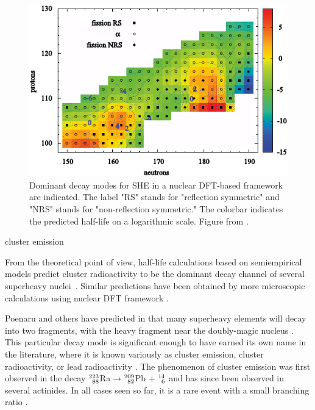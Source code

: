 \begin{figure}
	\centering
	\includegraphics[width=0.7\linewidth]{TeX_files/294Og_Warda2012_SHE}
	\caption[Dominant decay modes for SHE in a nuclear DFT-based framework.]{Dominant decay modes for SHE in a nuclear DFT-based framework are indicated. The label "RS" stands for "reflection symmetric" and "NRS" stands for "non-reflection symmetric." The colorbar indicates the predicted half-life on a logarithmic scale. Figure from \cite{Warda2012}.}
	\label{fig:warda2012she}
\end{figure}

cluster emission \cite{Sandulescu1980,Poenaru1986,Royer1998}

From the theoretical point of view, half-life calculations based on semiempirical models predict cluster radioactivity to be the dominant decay channel of several superheavy nuclei~\cite{Poenaru2011, Poenaru2012, Poenaru2013, Poenaru2015, Poenaru2018,Santhosh2018, Zhang2018}. Similar predictions have been obtained by more microscopic calculations using nuclear DFT framework \cite{Warda2011,Warda2018}.

Poenaru and others have predicted in \cite{Poenaru2011, Poenaru2012, Poenaru2013, Poenaru2015, Poenaru2018,Santhosh2018, Zhang2018} that many superheavy elements will decay into two fragments, with the heavy fragment near the doubly-magic nucleus {\Pb}. This particular decay mode is significant enough to have earned its own name in the literature, where it is known variously as cluster emission, cluster radioactivity, or lead radioactivity \cite{Sandulescu1980,Poenaru1986,Royer1998,Poenaru2010}. The phenomenon of cluster emission was first observed in the decay  $^{223}_{\hphantom{2}88}$Ra$\rightarrow$$^{209}_{\hphantom{2}82}$Pb + $^{14}_{\hphantom{1}6}$ \cite{Rose1984} and has since been observed in several actinides. In all cases seen so far, it is a rare event with a small branching ratio \cite{Poenaru2010}.

